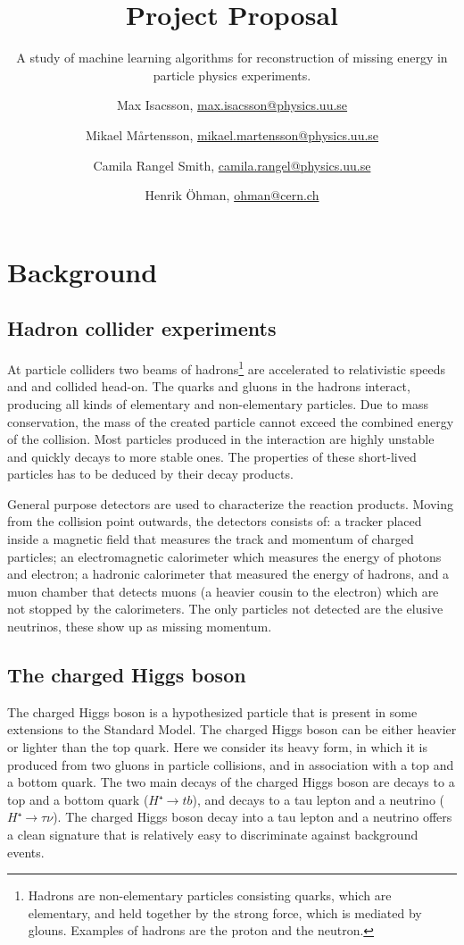 \documentclass{scrartcl}
\title{Project Proposal}
\subtitle{A study of machine learning algorithms for reconstruction of missing energy in particle physics experiments.}
\author{
  Max Isacsson, \url{max.isacsson@physics.uu.se}
  \and
  Mikael M\aa rtensson, \url{mikael.martensson@physics.uu.se}
  \and
  Camila Rangel Smith, \url{camila.rangel@physics.uu.se}
  \and
  Henrik Öhman, \url{ohman@cern.ch}
}
\begin{document}
\maketitle

\section{Background}
\subsection{Hadron collider experiments}
At particle colliders two beams of hadrons\footnote{Hadrons are non-elementary particles consisting quarks, which are elementary, and held together by the strong force, which is mediated by glouns. Examples of hadrons are the proton and the neutron.} are accelerated to relativistic speeds and and collided head-on. The quarks and gluons in the hadrons interact, producing all kinds of elementary and non-elementary particles. Due to mass conservation, the mass of the created particle cannot exceed the combined energy of the collision. Most particles produced in the interaction are highly unstable and quickly decays to more stable ones. The properties of these short-lived particles has to be deduced by their decay products.

General purpose detectors are used to characterize the reaction products. Moving from the collision point outwards, the detectors consists of: a tracker placed inside a magnetic field that measures the track and momentum of charged particles; an electromagnetic calorimeter which measures the energy of photons and electron; a hadronic calorimeter that measured the energy of hadrons, and a muon chamber that detects muons (a heavier cousin to the electron) which are not stopped by the calorimeters. The only particles not detected are the elusive neutrinos, these show up as missing momentum.

\subsection{The charged Higgs boson}
The charged Higgs boson is a hypothesized particle that is present in some extensions to the Standard Model. The charged Higgs boson can be either heavier or lighter than the top quark. Here we consider its heavy form, in which it is produced from two gluons in particle collisions, and in association with a top and a bottom quark. The two main decays of the charged Higgs boson are decays to a top and a bottom quark ($H⁺→tb$), and decays to a tau lepton and a neutrino ($H⁺→τν$). The charged Higgs boson decay into a tau lepton and a neutrino offers a clean signature that is relatively easy to discriminate against background events.
\end{document}
